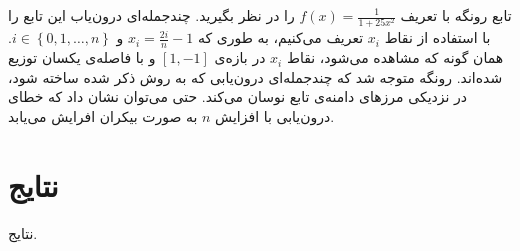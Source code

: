 \documentclass[12pt,onecolumn,a4paper]{article}
\begin{document}
تابع رونگه با تعریف 
$f(x)=\frac{1}{1+25x^2}$ 
را در نظر بگیرید. چندجمله‌ای درون‌یاب این تابع را با استفاده از نقاط 
$x_i$ 
تعریف می‌کنیم، به طوری که
$x_{i}=\frac{2i}{n}-1$ 
و 
$i\in \left\{0,1,\dots ,n\right\}$.
همان گونه که مشاهده می‌شود، نقاط 
$x_i$ 
در بازه‌ی 
$[1,-1]$ 
و با فاصله‌ی یکسان توزیع شده‌اند. رونگه متوجه شد که چندجمله‌ای درون‌یابی که به روش ذکر شده ساخته شود، در نزدیکی مرز‌های دامنه‌ی تابع نوسان می‌کند. حتی می‌توان نشان داد که خطای درون‌یابی با افزایش 
$n$ 
 به صورت بیکران افرایش می‌یابد.

 \begin{figure}
 \end{figure}

\section{نتایج}
نتایج.
\end{document}
